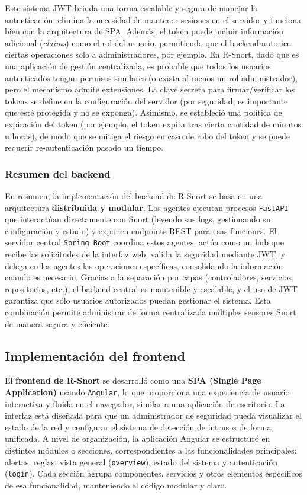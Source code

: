 \documentclass[11pt,a4paper,twoside]{report}
\begin{document}
Este sistema JWT brinda una forma escalable y segura de manejar la autenticación: elimina la necesidad de mantener sesiones en el servidor y funciona bien con la arquitectura de SPA. Además, el token puede incluir información adicional (\textit{claims}) como el rol del usuario, permitiendo que el backend autorice ciertas operaciones solo a administradores, por ejemplo. En R-Snort, dado que es una aplicación de gestión centralizada, es probable que todos los usuarios autenticados tengan permisos similares (o exista al menos un rol administrador), pero el mecanismo admite extensiones. La clave secreta para firmar/verificar los tokens se define en la configuración del servidor (por seguridad, es importante que esté protegida y no se exponga). Asimismo, se estableció una política de expiración del token (por ejemplo, el token expira tras cierta cantidad de minutos u horas), de modo que se mitiga el riesgo en caso de robo del token y se puede requerir re-autenticación pasado un tiempo.

\subsubsection{Resumen del backend}

En resumen, la implementación del backend de R-Snort se basa en una arquitectura \textbf{distribuida y modular}. Los agentes ejecutan procesos \texttt{FastAPI} que interactúan directamente con Snort (leyendo sus logs, gestionando su configuración y estado) y exponen endpoints REST para esas funciones. El servidor central \texttt{Spring Boot} coordina estos agentes: actúa como un hub que recibe las solicitudes de la interfaz web, valida la seguridad mediante JWT, y delega en los agentes las operaciones específicas, consolidando la información cuando es necesario. Gracias a la separación por capas (controladores, servicios, repositorios, etc.), el backend central es mantenible y escalable, y el uso de JWT garantiza que sólo usuarios autorizados puedan gestionar el sistema. Esta combinación permite administrar de forma centralizada múltiples sensores Snort de manera segura y eficiente.

\newpage

\subsection{Implementación del frontend}

El \textbf{frontend de R-Snort} se desarrolló como una \textbf{SPA (Single Page Application)} usando \texttt{Angular}, lo que proporciona una experiencia de usuario interactiva y fluida en el navegador, similar a una aplicación de escritorio. La interfaz está diseñada para que un administrador de seguridad pueda visualizar el estado de la red y configurar el sistema de detección de intrusos de forma unificada. A nivel de organización, la aplicación Angular se estructuró en distintos módulos o secciones, correspondientes a las funcionalidades principales: alertas, reglas, vista general (\texttt{overview}), estado del sistema y autenticación (\texttt{login}). Cada sección agrupa componentes, servicios y otros elementos específicos de esa funcionalidad, manteniendo el código modular y claro.
\end{document}
